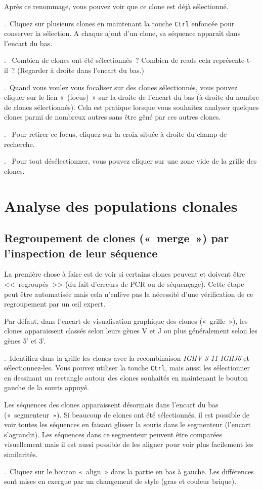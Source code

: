 \documentclass[11pt]{article}
\newcounter{questionum}
\newcommand\com[1]{\textsf{«~#1~»}}
\newcommand\question[1]{\par\noindent\textbf{\thequestionum}.~#1\addtocounter{questionum}{1}}
\begin{document}
\bigskip

Après ce renommage, vous pouvez voir que ce clone est déjà sélectionné.

\question{Cliquez sur plusieurs clones en maintenant la touche \texttt{Ctrl} enfoncée
  pour conserver la sélection. A chaque ajout d'un clone, sa séquence
  apparaît dans l'encart du bas.}
\question{
  Combien de clones ont été sélectionnés~? Combien de reads cela
  représente-t-il~? (Regarder à droite dans l'encart du bas.)}
\question{Quand vous voulez vous focaliser sur des clones sélectionnés, vous
  pouvez cliquer sur le lien \com{(focus)} sur la droite de l'encart du bas
  (à droite du nombre de clones sélectionnés).
  Cela est pratique lorsque vous souhaitez analyser quelques clones parmi de
  nombreux autres sans être gêné par ces autres clones.}
\question{%
  Pour retirer ce focus, cliquez sur la croix située à droite du champ
  de recherche.}
\question{%
  Pour tout désélectionner, vous pouvez cliquer sur une zone vide de
  la grille des clones.} %

\section{Analyse des populations clonales}

\subsection{Regroupement de clones («~merge~») par l'inspection de leur
    séquence}

La première chose à faire est de voir si certains clones peuvent et
doivent être <<~regroupés~>> (du fait d'erreurs de PCR ou de séquençage).
Cette étape peut être automatisée mais cela n'enlève pas la
nécessité d'une vérification de ce regroupement par un œil expert.

Par défaut, dans l'encart de visualisation graphique des clones
(«~grille~»), les clones apparaissent classés selon leurs gènes V et J
ou plus généralement selon les gènes 5' et 3'.

\question{Identifiez dans la grille les clones avec la recombinaison
  \textit{IGHV-3-11}-\textit{IGHJ6} et sélectionnez-les. Vous pouvez utiliser la touche \texttt{Ctrl}, mais aussi les
  sélectionner en dessinant un rectangle autour des clones souhaités en
  maintenant le bouton gauche de la souris appuyé.}

Les séquences des clones apparaissent désormais dans l'encart du bas
(«~segmenteur~»). Si beaucoup de clones ont été sélectionnés, il est
possible de voir toutes les séquences en faisant glisser la souris dans
le segmenteur (l'encart s'agrandit). Les séquences dans ce segmenteur
peuvent être comparées visuellement mais il est aussi possible de les
aligner pour voir plus facilement les similarités.
\question{Cliquez sur le bouton \com{align} dans la partie en bas à gauche. Les
  différences sont mises en exergue par un changement de style (gras et
  couleur brique).}
\end{document}
